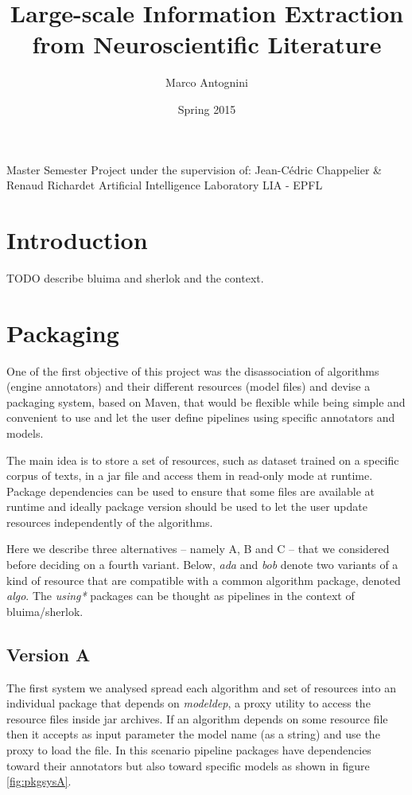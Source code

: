 \documentclass{article}
\title{Large-scale Information Extraction from Neuroscientific Literature}
\date{Spring 2015}
\author{Marco Antognini}
\newcommand{\id}[1]{\mbox{\textit{#1}}}
\begin{document}
\maketitle

Master Semester Project under the supervision of:
Jean-Cédric Chappelier \& 
Renaud Richardet
Artificial Intelligence Laboratory LIA - EPFL

\newpage
{}


\tableofcontents
\newpage


\section{Introduction}

TODO describe bluima and sherlok and the context.


\section{Packaging}

One of the first objective of this project was the disassociation of algorithms (engine annotators) and their different resources (model files) and devise a packaging system, based on Maven, that would be flexible while being simple and convenient to use and let the user define pipelines using specific annotators and models.

The main idea is to store a set of resources, such as dataset trained on a specific corpus of texts, in a jar file and access them in read-only mode at runtime. Package dependencies can be used to ensure that some files are available at runtime and ideally package version should be used to let the user update resources independently of the algorithms.

Here we describe three alternatives -- namely A, B and C -- that we considered before deciding on a fourth variant. Below, \id{ada} and \id{bob} denote two variants of a kind of resource that are compatible with a common algorithm package, denoted \id{algo}. The \id{using*} packages can be thought as pipelines in the context of bluima/sherlok.

\subsection{Version A}

The first system we analysed spread each algorithm and set of resources into an individual package that depends on \id{modeldep}, a proxy utility to access the resource files inside jar archives. If an algorithm depends on some resource file then it accepts as input parameter the model name (as a string) and use the proxy to load the file. In this scenario pipeline packages have dependencies toward their annotators but also toward specific models as shown in figure \ref{fig:pkgsysA}.
\end{document}
